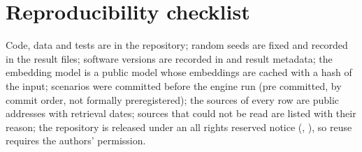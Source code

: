 \documentclass[conference]{IEEEtran}
\begin{document}
\section{Reproducibility checklist}
Code, data and tests are in the repository; random seeds are fixed and recorded in the result files; software versions are recorded in  and result metadata; the embedding model is a public model whose embeddings are cached with a hash of the input; scenarios were committed before the engine run (pre committed, by commit order, not formally preregistered); the sources of every row are public addresses with retrieval dates; sources that could not be read are listed with their reason; the repository is released under an all rights reserved notice (, ), so reuse requires the authors' permission.
\end{document}

